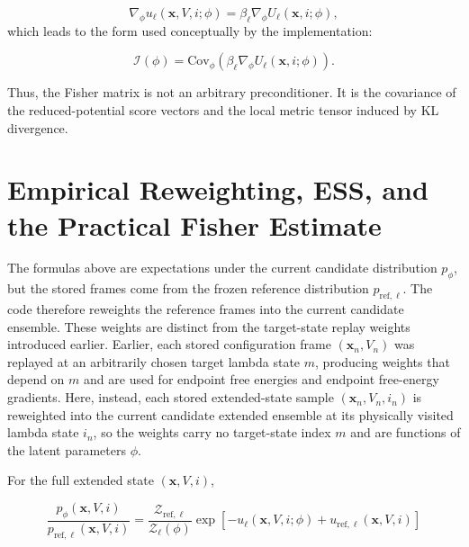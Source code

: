 \begin{equation}
    \nabla_\phi u_\ell(\mathbf{x}, V, i; \phi)
    =
    \beta_\ell
    \nabla_\phi U_\ell(\mathbf{x}, i; \phi),
    \label{eq:gradubeta}
\end{equation}
%
which leads to the form used conceptually by the implementation:

\begin{equation}
    \mathcal{I}(\phi)
    =
    \mathrm{Cov}_\phi
    \left(
        \beta_\ell
        \nabla_\phi U_\ell(\mathbf{x}, i; \phi)
    \right).
    \label{eq:fimcovgradu}
\end{equation}

Thus, the Fisher matrix is not an arbitrary preconditioner. It is the covariance of the reduced-potential score vectors and the local metric tensor induced by KL divergence.

\section{Empirical Reweighting, ESS, and the Practical Fisher Estimate}

The formulas above are expectations under the current candidate distribution $p_\phi$, but the stored frames come from the frozen reference distribution $p_{\mathrm{ref},\ell}$. The code therefore reweights the reference frames into the current candidate ensemble. These weights are distinct from the target-state replay weights introduced earlier. Earlier, each stored configuration frame $(\mathbf{x}_n, V_n)$ was replayed at an arbitrarily chosen target lambda state $m$, producing weights that depend on $m$ and are used for endpoint free energies and endpoint free-energy gradients. Here, instead, each stored extended-state sample $(\mathbf{x}_n, V_n, i_n)$ is reweighted into the current candidate extended ensemble at its physically visited lambda state $i_n$, so the weights carry no target-state index $m$ and are functions of the latent parameters $\phi$.

For the full extended state $(\mathbf{x}, V, i)$,

\begin{equation}
    \frac{
        p_\phi(\mathbf{x}, V, i)
    }{
        p_{\mathrm{ref},\ell}(\mathbf{x}, V, i)
    }
    =
    \frac{
        \mathcal{Z}_{\mathrm{ref},\ell}
    }{
        \mathcal{Z}_\ell(\phi)
    }
    \exp \left[
        -
        u_\ell(\mathbf{x}, V, i; \phi)
        +
        u_{\mathrm{ref},\ell}(\mathbf{x}, V, i)
    \right]
    \label{eq:ratio}
\end{equation}

